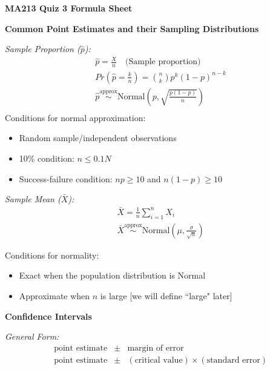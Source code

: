 \documentclass[8pt]{article}
\begin{document}
\begin{center}
    {\LARGE \textbf{MA213 Quiz 3 Formula Sheet}}
\end{center}

\vspace{1em}



\clearpage

\begin{multicols}{2} %

\textbf{Common Point Estimates and their Sampling Distributions}

\textit{Sample Proportion ($\hat{p}$):}
\begin{align*}
    &\hat{p} = \frac{X}{n} \quad \text{(Sample proportion)} \\
    &Pr\left(\hat{p}=\frac{k}{n}\right) = \binom{n}{k} p^k (1-p)^{n-k} \\
    &\hat{p} \stackrel{\text{approx}}{\sim} \text{Normal}\left(p, \sqrt{\frac{p(1-p)}{n}}\right) \\
\end{align*}
Conditions for normal approximation: 
\begin{itemize}
    \item Random sample/independent observations
    \item 10\% condition: $n \leq 0.1N$
    \item Success-failure condition: $np \ge 10$ and $n(1-p) \ge 10$
\end{itemize}

\textit{Sample Mean ($\bar{X}$):}
\begin{align*}
    &\bar{X} = \frac{1}{n} \sum_{i=1}^{n} X_i \\
    &\bar{X} \stackrel{\text{approx}}{\sim} \text{Normal}\left(\mu, \frac{\sigma}{\sqrt{n}}\right)
\end{align*}

Conditions for normality:
\begin{itemize}
    \item Exact when the population distribution is Normal
    \item Approximate when $n$ is large [we will define ``large" later]
\end{itemize}

\textbf{Confidence Intervals}

\textit{General Form:}
\begin{align*}
    &\text{point estimate} &\pm& \text{margin of error} \\
    &\text{point estimate} &\pm& (\text{critical value}) \times (\text{standard error})
\end{align*}


\end{multicols}
\end{document}
